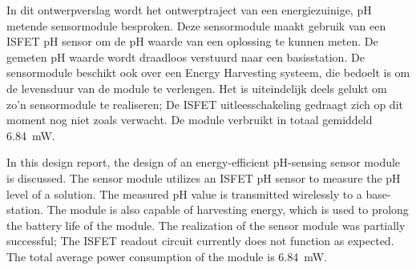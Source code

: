 In dit ontwerpverslag wordt het ontwerptraject van een energiezuinige, pH metende sensormodule besproken. Deze sensormodule maakt gebruik van een ISFET pH sensor om de pH waarde van een oplossing te kunnen meten.
De gemeten pH waarde wordt draadloos verstuurd naar een basisstation. De sensormodule beschikt ook over een Energy Harvesting systeem, die bedoelt is om de levensduur van de module te verlengen.
Het is uiteindelijk deels gelukt om zo'n sensormodule te realiseren; De ISFET uitleesschakeling gedraagt zich op dit moment nog niet zoals verwacht. De module verbruikt in totaal gemiddeld \qty{6.84}{\milli\watt}.


In this design report, the design of an energy-efficient pH-sensing sensor module is discussed. The sensor module utilizes an ISFET pH sensor to measure the pH level of a solution.
The measured pH value is transmitted wirelessly to a base-station. The module is also capable of harvesting energy, which is used to prolong the battery life of the module.
The realization of the sensor module was partially successful; The ISFET readout circuit currently does not function as expected. The total average power consumption of the module is \qty{6.84}{\milli\watt}.
